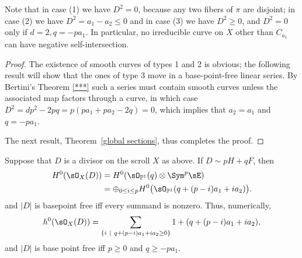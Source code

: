 Note that in case (1) we have $D^{2} = 0$, because any two fibers of $\pi$ are disjoint; in case (2) we have $D^{2}= a_{1}-a_{2}\leq 0$ and in case (3) we have $D^{2}\geq 0$, and $D^2=0$ only if
$d=2, q = -pa_1$. In particular, no irreducible curve
on $X$ other than $C_{a_1}$ can have negative self-intersection.

\begin{proof}
The existence of smooth curves of types 1 and 2 is obvious; the following result will show that
the ones of type 3 move in a base-point-free linear series. By Bertini's Theorem \ref{***} such a series must contain smooth curves unless the associated map factors through a curve, in which case $D^2 = dp^2-2pq = p(pa_1+pa_2 -2 q) = 0$, which implies that $a_2=a_1$ and $q= -pa_1$.

The next result, Theorem~\ref{global sections}, thus completes the proof.\end{proof}

\begin{theorem}\label{global sections}
Suppose that $D$ is a divisor on the scroll $X$ as above. If $D \sim pH+qF$, then 
\begin{align*}
 H^{0}(\sO_{X}(D)) &= H^{0}(\sO_{\PP^{1}}(q) \otimes \Sym^{p} \sE)\\
 &= 
\oplus_{0\leq i\leq p}H^{0}\bigl(\sO_{\PP^{1}}(q + (p-i)a_{1}+i a_{2})\bigr).
\end{align*}
and $|D|$ is basepoint free iff every summand is nonzero.
Thus, numerically,
$$
h^{0}(\sO_{X}(D)) = 
\sum_{\{i\ \mid\ q+(p-i)a_{1}+i a_{2} \geq 0\}}1+(q + (p-i)a_{1}+i a_{2}),
$$
and
$|D|$ is base point free iff $p\geq 0$ and $q\geq -pa_{1}$.
\end{theorem}

